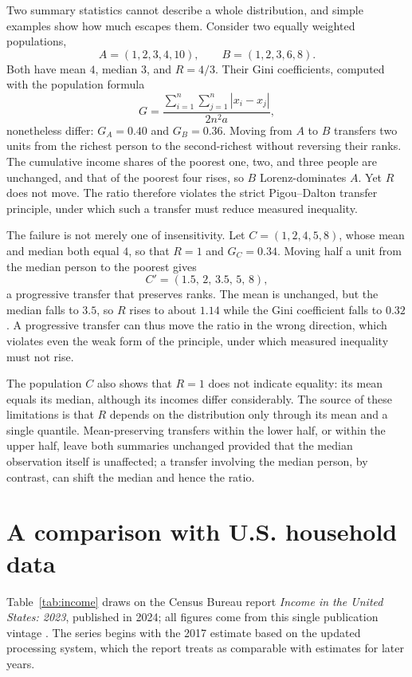 \documentclass[11pt,a4paper]{article}
\begin{document}
Two summary statistics cannot describe a whole distribution, and simple examples show how much escapes them. Consider two equally weighted populations,
\[
A=(1,2,3,4,10),\qquad B=(1,2,3,6,8).
\]
Both have mean $4$, median $3$, and $R=4/3$. Their Gini coefficients, computed with the population formula
\[
G=\frac{\sum_{i=1}^{n}\sum_{j=1}^{n}|x_i-x_j|}{2n^2a},
\]
nonetheless differ: $G_A=0.40$ and $G_B=0.36$. Moving from $A$ to $B$ transfers two units from the richest person to the second-richest without reversing their ranks. The cumulative income shares of the poorest one, two, and three people are unchanged, and that of the poorest four rises, so $B$ Lorenz-dominates $A$. Yet $R$ does not move. The ratio therefore violates the strict Pigou--Dalton transfer principle, under which such a transfer must reduce measured inequality.

The failure is not merely one of insensitivity. Let $C=(1,2,4,5,8)$, whose mean and median both equal $4$, so that $R=1$ and $G_C=0.34$. Moving half a unit from the median person to the poorest gives
\[
C'=(1.5,\,2,\,3.5,\,5,\,8),
\]
a progressive transfer that preserves ranks. The mean is unchanged, but the median falls to $3.5$, so $R$ rises to about $1.14$ while the Gini coefficient falls to $0.32$. A progressive transfer can thus move the ratio in the wrong direction, which violates even the weak form of the principle, under which measured inequality must not rise.

The population $C$ also shows that $R=1$ does not indicate equality: its mean equals its median, although its incomes differ considerably. The source of these limitations is that $R$ depends on the distribution only through its mean and a single quantile. Mean-preserving transfers within the lower half, or within the upper half, leave both summaries unchanged provided that the median observation itself is unaffected; a transfer involving the median person, by contrast, can shift the median and hence the ratio.


\section{A comparison with U.S. household data}
\label{sec:data}

Table~\ref{tab:income} draws on the Census Bureau report \emph{Income in the United States: 2023}, published in 2024; all figures come from this single publication vintage \cite{census}. The series begins with the 2017 estimate based on the updated processing system, which the report treats as comparable with estimates for later years.
\end{document}
